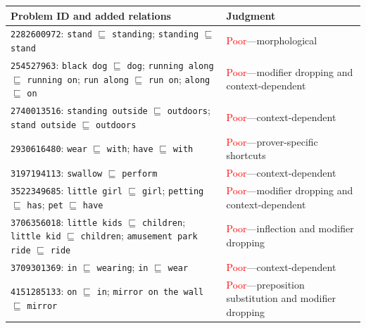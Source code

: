 
\begin{table}[t]
\centering
\small
\setlength{\tabcolsep}{4pt}
\begin{tabularx}{\textwidth}{@{}p{}p{}@{}}
\everycr{\noalign{\smallskip\midrule}}
\toprule
Problem ID and added relations & Judgment \\
\midrule
\texttt{2282600972}: \texttt{stand} $\sqsubseteq$ \texttt{standing}; \texttt{standing} $\sqsubseteq$ \texttt{stand} & \textcolor{red}{Poor}---morphological \\
\texttt{254527963}: \texttt{black dog} $\sqsubseteq$ \texttt{dog}; \texttt{running along} $\sqsubseteq$ \texttt{running on}; \texttt{run along} $\sqsubseteq$ \texttt{run on}; \texttt{along} $\sqsubseteq$ \texttt{on} & \textcolor{red}{Poor}---modifier dropping and context-dependent \\
\texttt{2740013516}: \texttt{standing outside} $\sqsubseteq$ \texttt{outdoors}; \texttt{stand outside} $\sqsubseteq$ \texttt{outdoors} & \textcolor{red}{Poor}---context-dependent \\
\texttt{2930616480}: \texttt{wear} $\sqsubseteq$ \texttt{with}; \texttt{have} $\sqsubseteq$ \texttt{with} & \textcolor{red}{Poor}---prover-specific shortcuts \\
\texttt{3197194113}: \texttt{swallow} $\sqsubseteq$ \texttt{perform} & \textcolor{red}{Poor}---context-dependent \\
\texttt{3522349685}: \texttt{little girl} $\sqsubseteq$ \texttt{girl}; \texttt{petting} $\sqsubseteq$ \texttt{has}; \texttt{pet} $\sqsubseteq$ \texttt{have} & \textcolor{red}{Poor}---modifier dropping and context-dependent \\
\texttt{3706356018}: \texttt{little kids} $\sqsubseteq$ \texttt{children}; \texttt{little kid} $\sqsubseteq$ \texttt{children}; \texttt{amusement park ride} $\sqsubseteq$ \texttt{ride} & \textcolor{red}{Poor}---inflection and modifier dropping \\
\texttt{3709301369}: \texttt{in} $\sqsubseteq$ \texttt{wearing}; \texttt{in} $\sqsubseteq$ \texttt{wear} & \textcolor{red}{Poor}---context-dependent \\
\texttt{4151285133}: \texttt{on} $\sqsubseteq$ \texttt{in}; \texttt{mirror on the wall} $\sqsubseteq$ \texttt{mirror} & \textcolor{red}{Poor}---preposition substitution and modifier dropping \\

\end{tabularx}
\end{table}

